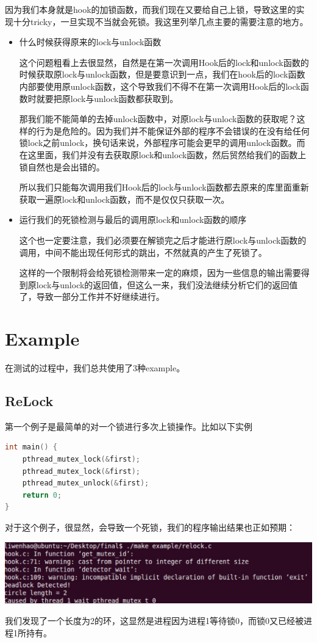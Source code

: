 \documentclass[titlepage]{article}
\begin{document}
\indent 因为我们本身就是hook的加锁函数，而我们现在又要给自己上锁，导致这里的实现十分tricky，一旦实现不当就会死锁。我这里列举几点主要的需要注意的地方。
\begin{itemize}
	\item 什么时候获得原来的lock与unlock函数
	
这个问题粗看上去很显然，自然是在第一次调用Hook后的lock和unlock函数的时候获取原lock与unlock函数，但是要意识到一点，我们在hook后的lock函数内部要使用原unlock函数，这个导致我们不得不在第一次调用Hook后的lock函数时就要把原lock与unlock函数都获取到。

那我们能不能简单的去掉unlock函数中，对原lock与unlock函数的获取呢？这样的行为是危险的。因为我们并不能保证外部的程序不会错误的在没有给任何锁lock之前unlock，换句话来说，外部程序可能会更早的调用unlock函数。而在这里面，我们并没有去获取原lock和unlock函数，然后贸然给我们的函数上锁自然也是会出错的。

所以我们只能每次调用我们Hook后的lock与unlock函数都去原来的库里面重新获取一遍原lock和unlock函数，而不是仅仅只获取一次。

	\item 运行我们的死锁检测与最后的调用原lock和unlock函数的顺序

这个也一定要注意，我们必须要在解锁完之后才能进行原lock与unlock函数的调用，中间不能出现任何形式的跳出，不然就真的产生了死锁了。

这样的一个限制将会给死锁检测带来一定的麻烦，因为一些信息的输出需要得到原lock与unlock的返回值，但这么一来，我们没法继续分析它们的返回值了，导致一部分工作并不好继续进行。
\end{itemize}

\section{Example}
在测试的过程中，我们总共使用了3种example。
\subsection{ReLock}
\indent 第一个例子是最简单的对一个锁进行多次上锁操作。比如以下实例
\begin{lstlisting}[language=C]
int main() {
    pthread_mutex_lock(&first);
    pthread_mutex_lock(&first);
    pthread_mutex_unlock(&first);
    return 0;
}
\end{lstlisting}
\indent 对于这个例子，很显然，会导致一个死锁，我们的程序输出结果也正如预期：
\begin{center}
\footnotesize
\includegraphics[scale=0.4]{example1.png}
\normalsize
\end{center}
\indent 我们发现了一个长度为2的环，这显然是进程因为进程1等待锁0，而锁0又已经被进程1所持有。
\end{document}
